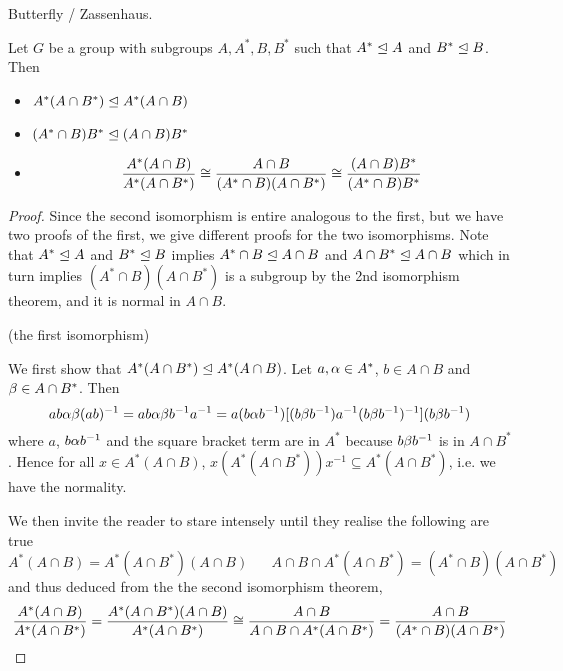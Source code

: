 \documentclass[../../book.tex]{subfiles}
\begin{document}
\begin{lem} Butterfly / Zassenhaus.
    
    Let $G$ be a group with subgroups $A, A^*, B, B^*$ such that 
    $A^* \trianglelefteq A$ and $B^* \trianglelefteq B$. 
    Then \begin{itemize}
        \item $A^* (A \cap B^*) \trianglelefteq A^* (A \cap B)$
        \item $(A^* \cap B) B^* \trianglelefteq (A \cap B) B^*$
        \item \[
            \frac {A^* (A \cap B)}{A^* (A \cap B^*)}
            \cong \frac{A \cap B}{(A^* \cap B)(A \cap B^*)}
            \cong \frac{(A \cap B)B^*}{(A^*\cap B)B^*}
        \]
    \end{itemize}
\end{lem}
\begin{proof}
    
    Since the second isomorphism is entire analogous to the first,
    but we have two proofs of the first,
    we give different proofs for the two isomorphisms.
    Note that $A^* \trianglelefteq A$ and $B^* \trianglelefteq B$
    implies $A^* \cap B \trianglelefteq A \cap B$ and $A \cap B^* \trianglelefteq A \cap B$
    which in turn implies $(A^* \cap B)(A \cap B^*)$ is a subgroup
    by the 2nd isomorphism theorem,
    and it is normal in $A \cap B$. 
    
    (the first isomorphism)
    
    We first show that $A^* (A \cap B^*) \trianglelefteq A^* (A \cap B)$. 
    Let $a, \alpha \in A^*$, $b \in A \cap B$ and $\beta \in A \cap B^*$. 
    Then \[
        ab \alpha\beta (ab)^{-1} = ab \alpha\beta b^{-1}a^{-1}
        = a (b\alpha b^{-1}) 
        [ (b\beta b^{-1}) a^{-1} (b\beta b^{-1})^{-1} ]
        (b\beta b^{-1})
    \]
    where $a$, $b\alpha b^{-1}$ and the square bracket term are in $A^*$
    because $b\beta b^{-1}$ is in $A \cap B^*$.
    Hence for all $x \in A^* (A \cap B)$, 
    $x (A^* (A \cap B^*)) x^{-1} \subseteq A^* (A \cap B^*)$,
    i.e. we have the normality. 
    
    We then invite the reader to stare intensely
    until they realise the following are true \[
        A^* (A \cap B) = A^* (A \cap B^*) (A \cap B) \,\,\,\,\,\,\,\,\,\,
        A \cap B \cap A^* (A \cap B^*) = (A^* \cap B)(A \cap B^*)
    \]
    and thus deduced from the the second isomorphism theorem, \[
        \frac {A^* (A \cap B)}{A^* (A \cap B^*)}
        = \frac {A^* (A \cap B^*)(A \cap B)}{A^* (A \cap B^*)}
        \cong \frac{A \cap B}{A \cap B \cap A^*(A \cap B^*) }
        = \frac{A \cap B}{(A^* \cap B)(A \cap B^*)}
    \]
    

\end{proof}
\end{document}
